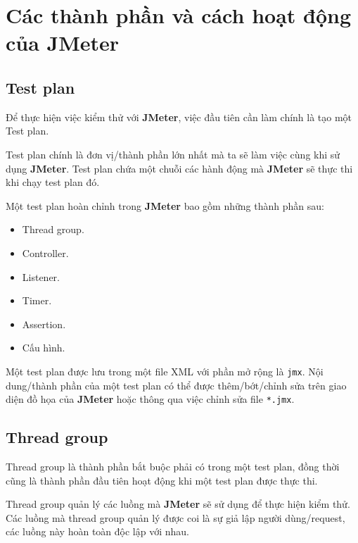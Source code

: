 \documentclass[10pt]{report}
\newcommand{\jmeter}{\textbf{JMeter}}
\begin{document}
\chapter{Các thành phần và cách hoạt động của JMeter}

\section{Test plan}

\par Để thực hiện việc kiểm thử với \jmeter{}, việc đầu tiên cần làm chính là tạo một Test plan.

\par Test plan chính là đơn vị/thành phần lớn nhất mà ta sẽ làm việc cùng khi sử dụng \jmeter{}. Test plan chứa một chuỗi các hành động mà \jmeter{} sẽ thực thi khi chạy test plan đó.

\par Một test plan hoàn chỉnh trong \jmeter{} bao gồm những thành phần sau:
\begin{itemize}[itemsep=0pt]
    \item Thread group.
    \item Controller.
    \item Listener.
    \item Timer.
    \item Assertion.
    \item Cấu hình.
\end{itemize}

\par Một test plan được lưu trong một file XML với phần mở rộng là \texttt{jmx}. Nội dung/thành phần của một test plan có thể được thêm/bớt/chỉnh sửa trên giao diện đồ họa của \jmeter{} hoặc thông qua việc chỉnh sửa file \texttt{*.jmx}.

\section{Thread group}

\par Thread group là thành phần bắt buộc phải có trong một test plan, đồng thời cũng là thành phần đầu tiên hoạt động khi một test plan được thực thi.

\par Thread group quản lý các luồng mà \jmeter{} sẽ sử dụng để thực hiện kiểm thử. Các luồng mà thread group quản lý được coi là sự giả lập người dùng/request, các luồng này hoàn toàn độc lập với nhau.
\end{document}
